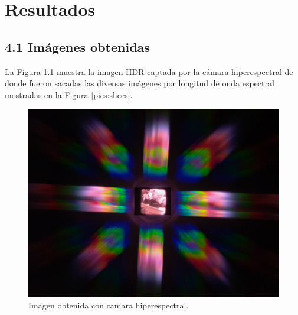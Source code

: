 
\chapter{Resultados} %
\label{Capitulo4}

\section{4.1 Imágenes obtenidas}
La Figura \ref{pics:originalHDR} muestra la imagen HDR captada por la cámara hiperespectral de donde fueron sacadas las diversas imágenes por longitud de onda espectral mostradas en la Figura \ref{pics:slices}.
\begin{figure}[h]
\begin{center}
\includegraphics[scale=.3]{./images/RESULTS/original.png}
\end{center}
\caption{Imagen obtenida con camara hiperespectral.}
\label{pics:originalHDR}
\end{figure}

